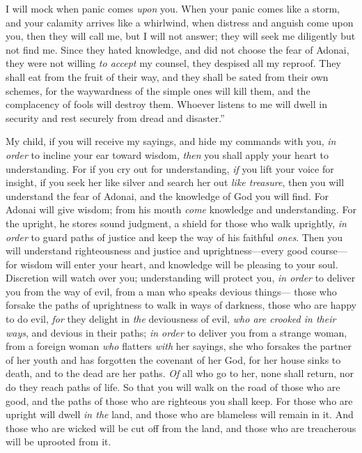 \begin{biblechapter}
I will mock when panic comes \textit{upon} you.
\verse When your panic comes like a storm, 
and your calamity arrives like a whirlwind, 
when distress and anguish come upon you,
\verse then they will call me, but I will not answer; 
they will seek me diligently but not find me.
\verse Since they hated knowledge, 
and did not choose the fear of Adonai,
\verse they were not willing \textit{to accept} my counsel, 
they despised all my reproof.
\verse They shall eat from the fruit of their way, 
and they shall be sated from their own schemes,
\verse for the waywardness of the simple ones will kill them, 
and the complacency of fools will destroy them.
\verse Whoever listens to me will dwell in security 
and rest securely from dread and disaster.”
\end{biblechapter}

\begin{biblechapter} %
 My child, if you will receive my sayings, 
and hide my commands with you,
\verse \textit{in order} to incline your ear toward wisdom, 
\textit{then} you shall apply your heart to understanding.
\verse For if you cry out for understanding, 
\textit{if} you lift your voice for insight,
\verse if you seek her like silver 
and search her out \textit{like treasure},
\verse then you will understand the fear of Adonai, 
and the knowledge of God you will find.
\verse For Adonai will give wisdom; 
from his mouth \textit{come} knowledge and understanding.
\verse For the upright, he stores sound judgment, a shield for those who walk uprightly,
\verse \textit{in order} to guard paths of justice 
and keep the way of his faithful \textit{ones}.
\verse Then you will understand righteousness and justice 
and uprightness—every good course—
\verse for wisdom will enter your heart, 
and knowledge will be pleasing to your soul.
\verse Discretion will watch over you; 
understanding will protect you,
\verse \textit{in order} to deliver you from the way of evil, 
from a man who speaks devious things—
\verse those who forsake the paths of uprightness 
to walk in ways of darkness,
\verse those who are happy to do evil, 
\textit{for} they delight in \textit{the} deviousness of evil,
\verse \textit{who are crooked in their ways}, 
and devious in their paths;
\verse \textit{in order} to deliver you from a strange woman, 
from a foreign woman \textit{who} flatters \textit{with} her sayings,
\verse she who forsakes the partner of her youth 
and has forgotten the covenant of her God,
\verse for her house sinks to death, 
and to the dead are her paths.
\verse \textit{Of} all who go to her, none shall return, 
nor do they reach paths of life.
\verse So that you will walk on the road of those who are good, 
and the paths of those who are righteous you shall keep.
\verse For those who are upright will dwell \textit{in the} land, 
and those who are blameless will remain in it.
\verse And those who are wicked will be cut off from the land, 
and those who are treacherous will be uprooted from it.
\end{biblechapter}

